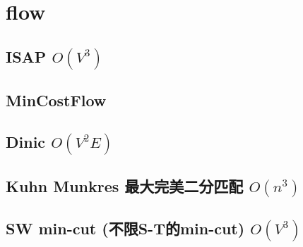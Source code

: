 \documentclass[a4paper,10pt,twocolumn,oneside]{article}
\begin{document}
\section{flow}

\subsection{ISAP $O(V^{3})$}


\subsection{MinCostFlow}


\subsection{Dinic $O(V^{2}E)$}


%

%

\subsection{Kuhn Munkres 最大完美二分匹配 $O(n^{3})$}


%

\subsection{SW min-cut (不限S-T的min-cut) $O(V^{3})$}


% 
\end{document}
